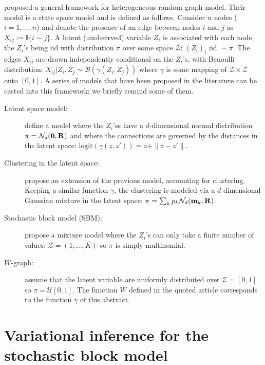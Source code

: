 \documentclass[graybox]{svmult}
\begin{document}
\cite{BJR07} proposed a general framework for heterogeneous random graph model. Their model is a state space model and is defined as follows. Consider $n$ nodes ($i = 1, \dots, n$) and denote the presence of an edge between nodes $i$ and $j$ as $X_{ij} := \mathbb I\{i \sim j\}$. A latent (unobserved) variable $Z_i$ is associated with each node, the $Z_i$'s being iid with distribution $\pi$ over some space $\mathcal Z$: $
(Z_i)_i \text{ iid } \sim \pi.$
The edges $X_{ij}$ are drawn independently conditional on the $Z_i$'s, with Benoulli distribution:
$X_{ij} | Z_i, Z_j \sim \mathcal B(\gamma(Z_i, Z_j))$
where $\gamma$ is some mapping of $\mathcal Z \times \mathcal Z$ onto $[0, 1]$.
A series of models that have been proposed in the literature can be casted into this framework; we briefly remind some of them.
\begin{description}
 \item[Latent space model:] \cite{HRH02} define a model where the $Z_i$'ss have a $d$-dimensional normal distribution $\pi = \mathcal N_d(\bf 0, \bf R)$ and where the connections are governed by the distances in the latent space: $\text{logit}(\gamma(z, z')) = a + \|z - z'\|$.
 \item[Clustering in the latent space:] \cite{HRT07} propose an extension of the previous model, accounting for clustering. Keeping a similar function $\gamma$, the clustering is modeled via a $d$-dimensional Gaussian mixture in the latent space: $\pi = \sum_k p_k \mathcal N_d({\bf m}_k, \bf R)$.
 \item[Stochastic block model (SBM):] \cite{NoS01} propose a mixture model where the $Z_i$'s can only take a finite number of values: $\mathcal Z = (1, \dots, K)$ so $\pi$ is simply multinomial.
 \item[$W$-graph:] \cite{LoS06} assume that the latent variable are uniformly distributed over $\mathcal Z = [0, 1]$ so $\pi = \mathcal U[0, 1]$. The function $W$ defined in the quoted article corresponds to the function $\gamma$ of this abstract.
\end{description}
\section{Variational inference for the stochastic block model}
\end{document}
